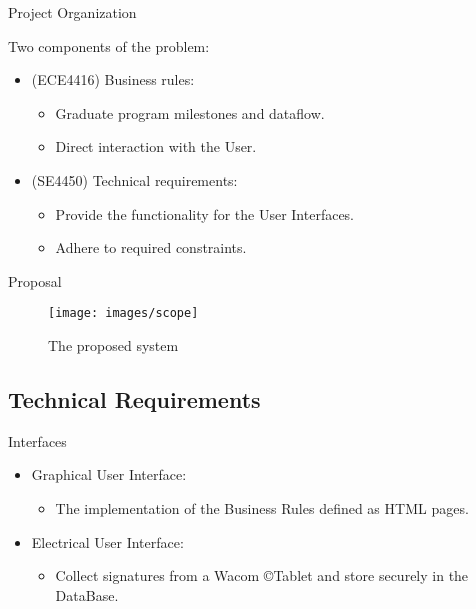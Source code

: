 \documentclass{beamer}
\begin{document}
\begin{frame}{Project Organization}

Two components of the problem:
\begin{itemize}
\item
(ECE4416) Business rules:
\begin{itemize}
\item
Graduate program milestones and dataflow.
\item
Direct interaction with the User.
\end{itemize}
\item 
(SE4450) Technical requirements:
\begin{itemize}
\item
Provide the functionality for the User Interfaces.
\item 
Adhere to required constraints.
\end{itemize}
\end{itemize}



\end{frame}
\begin{frame}{Proposal}

\begin{figure}
\texttt{[image: images/scope]} \caption{ The proposed system }
\end{figure}

\end{frame}

\subsection{Technical Requirements}

\begin{frame}{Interfaces}
\begin{itemize}
\item 
Graphical User Interface:
\begin{itemize}
\item 
The implementation of the Business Rules defined as HTML pages. 
\end{itemize}
\item 
Electrical User Interface:
	\begin{itemize}
	\item 
	Collect signatures from a Wacom \copyright Tablet and store securely in the DataBase.
	\end{itemize}
\end{itemize}
\end{frame}
\end{document}
